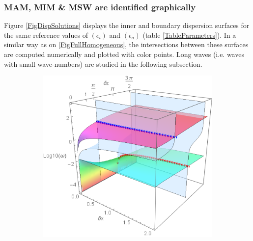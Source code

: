 \documentclass[a4paper,11pt]{article}
\begin{document}
\subsubsection{MAM, MIM \& MSW are identified graphically}
Figure \ref{FigDispSolutions} displays the inner and boundary dispersion surfaces for the same reference values of  $(\epsilon_i)$ and $(\epsilon_a)$ (table \ref{TableParameters}). In a similar way as on \ref{FigFullHomogeneous}, the intersections between these surfaces are computed numerically and plotted with color points. Long waves (i.e. waves with small wave-numbers) are studied in the following subsection.\\
\begin{figure}[!h]
	\centering		
	\begin{subfigure}{0.45\linewidth}
		\includegraphics[width=1\linewidth]{FIGURES/Fig_Inter_Real.png}
		\caption{}
	\end{subfigure}
	~
	\centering
	\begin{subfigure}{0.45\linewidth}

\end{subfigure}
\end{figure}
\end{document}
